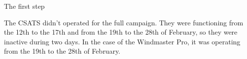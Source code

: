 The first step 

The CSATS didn't operated for the full campaign. They were functioning from the 12th to the 17th and from the 19th to the 28th of February, so they were inactive during two days. In the case of the Windmaster Pro, it was operating from the 19th to the 28th of February. 